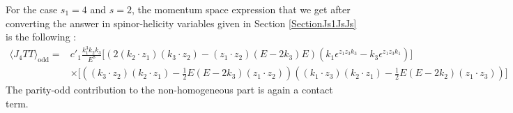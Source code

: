 \documentclass[a4paper,11pt]{article}
\begin{document}
    For the case $s_1=4$ and $s=2$, the momentum space expression that we get after converting the answer in spinor-helicity variables given in Section \ref{SectionJs1JsJs} is the following :
\begin{align}
    \langle J_4 T T \rangle_{\text{odd}}= &c'_{1}\frac{k_1^3 k_2 k_3}{E^8} \bigg[\left(2 (k_2 \cdot z_1)(k_3 \cdot z_2)-\left(z_{1} \cdot z_{2}\right)(E-2k_3)E\right) \left( k_1\epsilon^{z_{1} z_{3} k_{3}}-  k_3  \epsilon^{z_{1} z_{3} k_{1}}\right)\bigg] \nonumber\\[5 pt]
     &\times\bigg[\left((k_3 \cdot z_2)(k_2 \cdot z_1)-\frac{1}{2}E(E-2k_3)(z_1 \cdot z_2)\right)
   \left((k_1 \cdot z_3)(k_2 \cdot z_1)-\frac{1}{2}E(E-2k_2)(z_1 \cdot z_3)\right)\bigg]
\end{align}
The parity-odd contribution to the non-homogeneous part is again a contact term.



\end{document}
